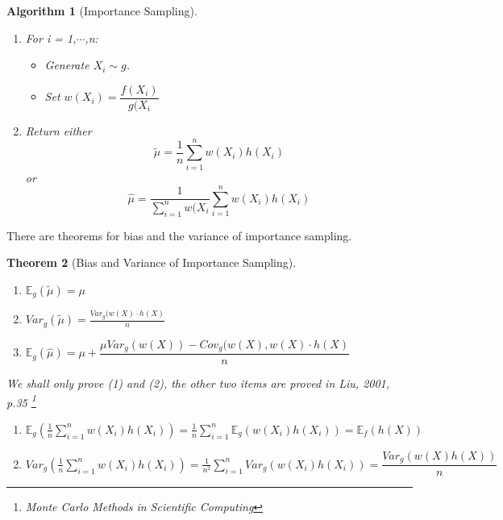 \documentclass[a4paper,10pt]{article}
\newtheorem{theorem}{Theorem}[section]
\newtheorem{algorithm}[theorem]{Algorithm}
\newenvironment{proof}[1][Proof]{\begin{trivlist}
\item[\hskip \labelsep {\bfseries #1}]}{\end{trivlist}}
\begin{document}
  \begin{algorithm}[Importance Sampling]
  \begin{enumerate}
   \item For i = 1,$\cdots$,n:
   \begin{itemize}
    \item Generate $X_i \sim g$.
    \item Set $w(X_i) = \dfrac{f(X_i)}{g(X_i}$
 
 \end{itemize}
\item Return either 
\begin{equation*}
 \tilde{\mu} =  \frac{1}{n} \sum_{i=1}^{n} w(X_i)h(X_i) 
\end{equation*}
or 
\begin{equation*}\hat{\mu} =  \frac{1}{\sum_{i=1}^{n}w(X_i} \sum_{i=1}^{n} w(X_i)h(X_i) 
\end{equation*}
  \end{enumerate}

   
  \end{algorithm}
There are theorems for bias and the variance of importance sampling.
\begin{theorem}[Bias and Variance of Importance Sampling]\label{Bias}
\begin{enumerate}
 \item $\mathbb{E}_{g}(\tilde{\mu}) = \mu$
 \item $Var_{g}(\tilde{\mu}) = \frac{Var_{g}(w(X)\cdot h(X)}{n}$

 \item $\mathbb{E}_{g}(\hat{\mu}) = \mu + \dfrac{\mu Var_{g}(w(X)) - Cov_{g}(w(X),w(X)\cdot h(X)}{n}$
 \end{enumerate}

\begin{proof}
 We shall only prove (1) and (2), the other two items are proved in Liu, 2001, p.35
 \footnote{Monte Carlo Methods in Scientific Computing}
 \begin{enumerate}
  \item $\mathbb{E}_{g}\left(  \frac{1}{n} \sum_{i=1}^{n} w(X_i)h(X_i) \right) = \frac{1}{n} \sum_{i=1}^{n} \mathbb{E}_{g}(w(X_i)h(X_i)) 
  = \mathbb{E}_{f}(h(X))$
  \item $Var_g\left(\frac{1}{n} \sum_{i=1}^{n} w(X_{i})h(X_i)\right) = \frac{1}{n^2} \sum_{i=1}^{n}Var_{g}(w(X_{i})h(X_i))
  = \dfrac{Var_{g}(w(X)h(X))}{n}$
 \end{enumerate}

\end{proof}
 
\end{theorem}
\end{document}
